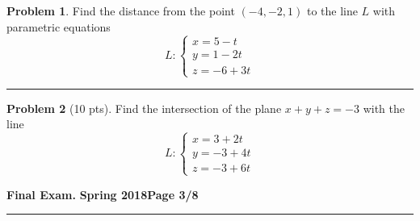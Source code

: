 \documentclass[12pt]{article}
\theoremstyle{definition}
\newtheorem{problem}{Problem}
\begin{document}
\bigskip
\begin{problem}
Find the distance from the point $(-4,-2,1)$ to the line $L$ with parametric equations
\begin{equation*}
L : \begin{cases}
x = 5 -t \\
y = 1 - 2t \\
z = -6 + 3t
\end{cases}
\end{equation*}
\vspace{6cm}
\begin{flushright}
\end{flushright}
\end{problem}
\hrule
\begin{problem}[10 pts]
Find the intersection of the plane $x+y+z=-3$ with the line
\begin{equation*}
L : \begin{cases}
x = 3 + 2t \\
y = -3 + 4t \\
z = -3 + 6t
\end{cases}
\end{equation*}
\vspace{6cm}
\begin{flushright}
\end{flushright}
\end{problem}
\newpage

\hfill{\large\bf Final Exam.}\hfill{\large\bf
  Spring 2018}\hfill{\large\bf Page 3/8}\hrule
\end{document}
